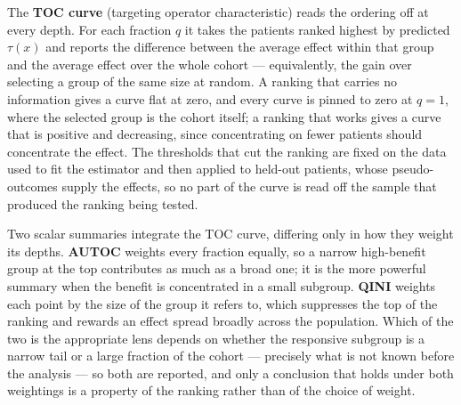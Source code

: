 \vspace{10pt}

The \textbf{TOC curve} (targeting operator characteristic) reads the ordering
off at every depth. For each fraction $q$ it takes the patients ranked
highest by predicted $\tau(x)$ and reports the difference between the average effect within that
group and the average effect over the whole cohort — equivalently, the gain
over selecting a group of the same size at random. A ranking that carries no
information gives a curve flat at zero, and every curve is pinned to zero at
$q=1$, where the selected group is the cohort itself; a ranking that works
gives a curve that is positive and decreasing, since concentrating on fewer
patients should concentrate the effect. The thresholds that cut the ranking
are fixed on the data used to fit the estimator and then applied to held-out
patients, whose pseudo-outcomes supply the effects, so no part of the curve
is read off the sample that produced the ranking being tested.

\vspace{10pt}

Two scalar summaries integrate the TOC curve, differing only in how they
weight its depths. \textbf{AUTOC} weights every fraction equally, so a narrow
high-benefit group at the top contributes as much as a broad one; it is the
more powerful summary when the benefit is concentrated in a small subgroup.
\textbf{QINI} \citep{radcliffe2007} weights each point by the size of the group it refers to, which
suppresses the top of the ranking and rewards an effect spread broadly across
the population. Which of the two is the appropriate lens depends on whether
the responsive subgroup is a narrow tail or a large fraction of the cohort —
precisely what is not known before the analysis — so both are reported, and
only a conclusion that holds under both weightings is a property of the
ranking rather than of the choice of weight.

\vspace{10pt}

